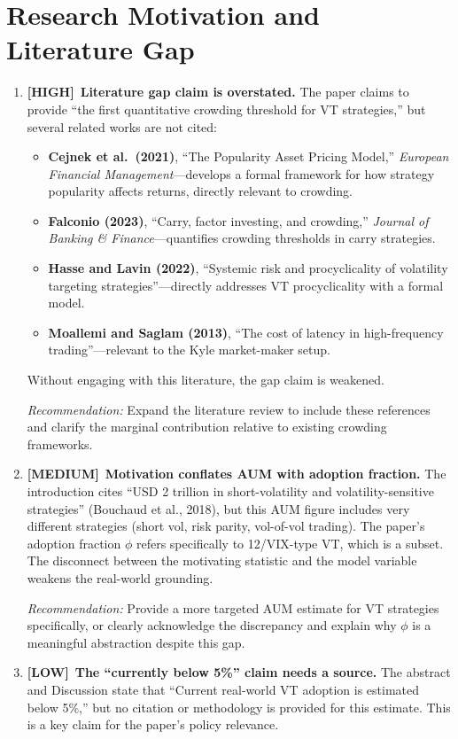 \documentclass[12pt,a4paper]{article}
\newcommand{\HIGH}{\textbf{\textcolor{highred}{[HIGH]}}}
\newcommand{\MEDIUM}{\textbf{\textcolor{medorange}{[MEDIUM]}}}
\newcommand{\LOW}{\textbf{\textcolor{lowgreen}{[LOW]}}}
\begin{document}
\section{Research Motivation and Literature Gap}
\label{sec:motivation}

\begin{enumerate}[leftmargin=2em,resume]

\item \HIGH\ \textbf{Literature gap claim is overstated.} The paper claims to provide ``the first quantitative crowding threshold for VT strategies,'' but several related works are not cited:
\begin{itemize}
  \item \textbf{Cejnek et al.\ (2021)}, ``The Popularity Asset Pricing Model,'' \emph{European Financial Management}---develops a formal framework for how strategy popularity affects returns, directly relevant to crowding.
  \item \textbf{Falconio (2023)}, ``Carry, factor investing, and crowding,'' \emph{Journal of Banking \& Finance}---quantifies crowding thresholds in carry strategies.
  \item \textbf{Hasse and Lavin (2022)}, ``Systemic risk and procyclicality of volatility targeting strategies''---directly addresses VT procyclicality with a formal model.
  \item \textbf{Moallemi and Saglam (2013)}, ``The cost of latency in high-frequency trading''---relevant to the Kyle market-maker setup.
\end{itemize}
Without engaging with this literature, the gap claim is weakened.

\textit{Recommendation:} Expand the literature review to include these references and clarify the marginal contribution relative to existing crowding frameworks.

\item \MEDIUM\ \textbf{Motivation conflates AUM with adoption fraction.} The introduction cites ``USD 2 trillion in short-volatility and volatility-sensitive strategies'' (Bouchaud et al., 2018), but this AUM figure includes very different strategies (short vol, risk parity, vol-of-vol trading). The paper's adoption fraction $\phi$ refers specifically to 12/VIX-type VT, which is a subset. The disconnect between the motivating statistic and the model variable weakens the real-world grounding.

\textit{Recommendation:} Provide a more targeted AUM estimate for VT strategies specifically, or clearly acknowledge the discrepancy and explain why $\phi$ is a meaningful abstraction despite this gap.

\item \LOW\ \textbf{The ``currently below 5\%'' claim needs a source.} The abstract and Discussion state that ``Current real-world VT adoption is estimated below 5\%,'' but no citation or methodology is provided for this estimate. This is a key claim for the paper's policy relevance.

\end{enumerate}
\end{document}
